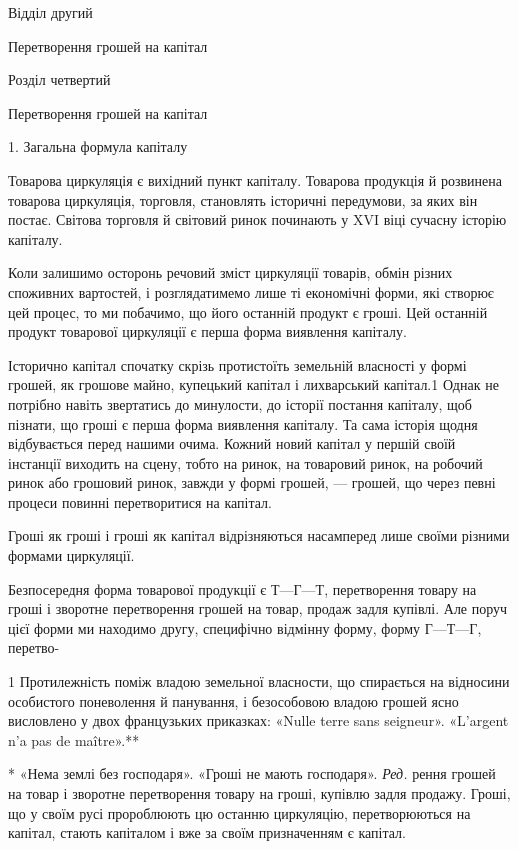 Відділ другий

Перетворення грошей на капітал

Розділ четвертий

Перетворення грошей на капітал

1. Загальна формула капіталу

Товарова циркуляція є вихідний пункт капіталу. Товарова
продукція й розвинена товарова циркуляція, торговля, становлять
історичні передумови, за яких він постає. Світова торговля
й світовий ринок починають у XVI віці сучасну історію
капіталу.

Коли залишимо осторонь речовий зміст циркуляції товарів,
обмін різних споживних вартостей, і розглядатимемо лише ті
економічні форми, які створює цей процес, то ми побачимо,
що його останній продукт є гроші. Цей останній продукт товарової
циркуляції є перша форма виявлення капіталу.

Історично капітал спочатку скрізь протистоїть земельній
власності у формі грошей, як грошове майно, купецький капітал
і лихварський капітал.1 Однак не потрібно навіть звертатись до
минулости, до історії постання капіталу, щоб пізнати, що гроші
є перша форма виявлення капіталу. Та сама історія щодня відбувається
перед нашими очима. Кожний новий капітал у першій
своїй інстанції виходить на сцену, тобто на ринок, на товаровий
ринок, на робочий ринок або грошовий ринок, завжди у формі
грошей, — грошей, що через певні процеси повинні перетворитися
на капітал.

Гроші як гроші і гроші як капітал відрізняються насамперед
лише своїми різними формами циркуляції.

Безпосередня форма товарової продукції є $Т — Г — Т$, перетворення
товару на гроші і зворотне перетворення грошей на
товар, продаж задля купівлі. Але поруч цієї форми ми находимо
другу, специфічно відмінну форму, форму $Г — Т — Г$, перетво-

1    Протилежність поміж владою земельної власности, що спирається
на відносини особистого поневолення й панування, і безособовою владою
грошей ясно висловлено у двох французьких приказках: «Nulle terre
sans seigneur». «L’argent n’a pas de maître».**

* «Нема землі без господаря». «Гроші не мають господаря». \emph{Ред.}
рення грошей на товар і зворотне перетворення товару на гроші,
купівлю задля продажу. Гроші, що у своїм русі пророблюють
цю останню циркуляцію, перетворюються на капітал, стають
капіталом і вже за своїм призначенням є капітал.

